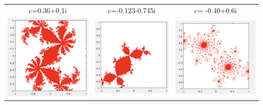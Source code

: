 \documentclass[11pt]{article}
\theoremstyle{plain}
\theoremstyle{definition}
\begin{document}
\begin{tabular}{c c c}
	c=0.36+0.1i                                   &c=-0.123-0.745i                         &c= -0.40+0.6i\\
	\includegraphics*[scale = 0.3]{Plot3.png} 
	& \includegraphics*[scale = 0.3]{Plot4.png} 
	&\includegraphics*[scale = 0.3]{Plot5.png} 
\end{tabular}
\end{document}
